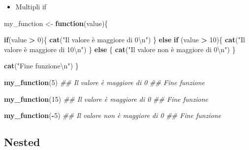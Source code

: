 \documentclass[
]{book}
\newenvironment{Shaded}{\begin{snugshade}}{\end{snugshade}}
\newcommand{\CharTok}[1]{\textcolor[rgb]{0.31,0.60,0.02}{#1}}
\newcommand{\CommentTok}[1]{\textcolor[rgb]{0.56,0.35,0.01}{\textit{#1}}}
\newcommand{\ControlFlowTok}[1]{\textcolor[rgb]{0.13,0.29,0.53}{\textbf{#1}}}
\newcommand{\DecValTok}[1]{\textcolor[rgb]{0.00,0.00,0.81}{#1}}
\newcommand{\KeywordTok}[1]{\textcolor[rgb]{0.13,0.29,0.53}{\textbf{#1}}}
\newcommand{\NormalTok}[1]{#1}
\newcommand{\OperatorTok}[1]{\textcolor[rgb]{0.81,0.36,0.00}{\textbf{#1}}}
\newcommand{\StringTok}[1]{\textcolor[rgb]{0.31,0.60,0.02}{#1}}
\providecommand{\tightlist}{%
  \setlength{\itemsep}{0pt}\setlength{\parskip}{0pt}}
\begin{document}
\begin{itemize}
\tightlist
\item
  Multipli if
\end{itemize}

\begin{Shaded}
\begin{Highlighting}[]
\NormalTok{my_function <-}\StringTok{ }\ControlFlowTok{function}\NormalTok{(value)\{}
  
  \ControlFlowTok{if}\NormalTok{(value }\OperatorTok{>}\StringTok{ }\DecValTok{0}\NormalTok{)\{}
    \KeywordTok{cat}\NormalTok{(}\StringTok{"Il valore è maggiore di 0}\CharTok{\textbackslash{}n}\StringTok{"}\NormalTok{)}
\NormalTok{  \} }\ControlFlowTok{else} \ControlFlowTok{if}\NormalTok{ (value }\OperatorTok{>}\StringTok{ }\DecValTok{10}\NormalTok{)\{}
    \KeywordTok{cat}\NormalTok{(}\StringTok{"Il valore è maggiore di 10}\CharTok{\textbackslash{}n}\StringTok{"}\NormalTok{)}
\NormalTok{  \} }\ControlFlowTok{else}\NormalTok{ \{}
    \KeywordTok{cat}\NormalTok{(}\StringTok{"Il valore non è maggiore di 0}\CharTok{\textbackslash{}n}\StringTok{"}\NormalTok{)}
\NormalTok{  \}}
  
  \KeywordTok{cat}\NormalTok{(}\StringTok{"Fine funzione}\CharTok{\textbackslash{}n}\StringTok{"}\NormalTok{)}
\NormalTok{\}}

\KeywordTok{my_function}\NormalTok{(}\DecValTok{5}\NormalTok{)}
\CommentTok{## Il valore è maggiore di 0}
\CommentTok{## Fine funzione}

\KeywordTok{my_function}\NormalTok{(}\DecValTok{15}\NormalTok{)}
\CommentTok{## Il valore è maggiore di 0}
\CommentTok{## Fine funzione}

\KeywordTok{my_function}\NormalTok{(}\OperatorTok{-}\DecValTok{5}\NormalTok{)}
\CommentTok{## Il valore non è maggiore di 0}
\CommentTok{## Fine funzione}
\end{Highlighting}
\end{Shaded}

\hypertarget{nested}{%
\subsection{Nested}\label{nested}}
\end{document}
